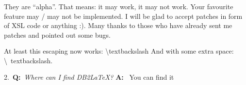 \documentclass[pdftex,english,a4paper,10pt]{article}
\begin{document}
They are {``}alpha{''}. That means: it may work, it may not work. Your favourite feature may / may not be implemented. I will be glad to accept patches in form of XSL code or anything :). Many thanks to those who have already sent me patches and pointed out some bugs.

At least this escaping now works: \textbackslash textbackslash And with some extra space: \textbackslash \ textbackslash.


\vspace{1em}
\noindent{}2.~\textbf{Q:}~\textit{Where can I find DB2LaTeX?}
\newline
\noindent\textbf{A:}~
You can find it


\vspace{1em}

\end{document}

